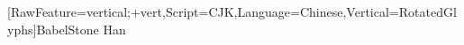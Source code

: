 \usepackage{graphicx} %


[RawFeature={vertical;+vert},Script=CJK,Language=Chinese,Vertical=RotatedGlyphs]{BabelStone Han}

\newcommand*\CJKmovesymbol[1]{\raise.35em\hbox{#1}}
\newcommand*\CJKmove{\punctstyle{plain}%
  \let\CJKsymbol\CJKmovesymbol
  \let\CJKpunctsymbol\CJKsymbol}

\newcommand{\VertCell}[1]{\rotatebox{-90}{\CJKfamily{BabelStoneVert}\CJKmove #1}}
